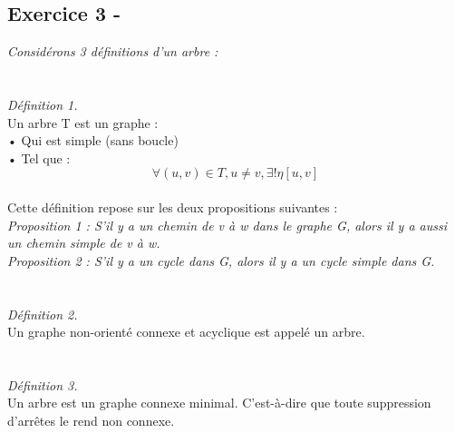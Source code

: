 \documentclass{article}
\begin{document}
\subsection*{Exercice 3 -}
\textit{Considérons 3 définitions d'un arbre : }\\\\\\

\textit{Définition 1.}\\
\textsf{Un arbre T est un graphe :}\\
\textsf{• Qui est simple (sans boucle)}\\
\textsf{• Tel que : }\\
\begin{equation}
\forall (u,v) \in T, u \neq v, \exists! \eta[u,v]
\end{equation}\\
\textsf{Cette définition repose sur les deux propositions suivantes :}\\
\textit{Proposition 1 : S'il y a un chemin de v à w dans le graphe G, alors il y a aussi un chemin simple de v à w.}\\
\textit{Proposition 2 : S'il y a un cycle dans G, alors il y a un cycle simple dans G.}\\\\\\

\textit{Définition 2.}\\
\textsf{Un graphe non-orienté connexe et acyclique est appelé un arbre.}\\\\\\

\textit{Définition 3.}\\
\textsf{Un arbre est un graphe connexe minimal. C'est-à-dire que toute suppression d'arrêtes le rend non connexe.}\\\\\\
\end{document}
